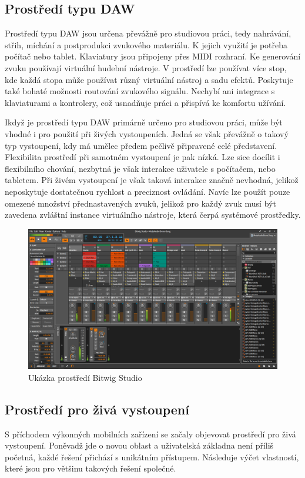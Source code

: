 \documentclass[thesis=M,czech]{FITthesis}[2019/03/06]
\begin{document}
		\subsection{Prostředí typu DAW}
			Prostředí typu DAW jsou určena převážně pro studiovou práci, tedy nahrávání, střih, míchání a postprodukci zvukového materiálu.
			K jejich využití je potřeba počítač nebo tablet. Klaviatury jsou připojeny přes MIDI rozhraní. Ke generování zvuku používají virtuální hudební nástroje.
			V prostředí lze používat více stop, kde každá stopa může používat různý virtuální nástroj a sadu efektů.
			Poskytuje také bohaté možnosti routování zvukového signálu.
			Nechybí ani integrace s klaviaturami a kontrolery, což usnadňuje práci a přispívá ke komfortu užívání.
			
			Ikdyž je prostředí typu DAW primárně určeno pro studiovou práci, může být vhodné i pro použití při živých vystoupeních.
			Jedná se však převážně o takový typ vystoupení, kdy má umělec předem pečlivě připravené celé představení.
			Flexibilita prostředí při samotném vystoupení je pak nízká.
			Lze sice docílit i flexibilního chování, nezbytná je však interakce uživatele s počítačem, nebo tabletem. Při živém vystoupení
			je však taková interakce značně nevhodná, jelikož neposkytuje dostatečnou rychlost a preciznost ovládání.
			Navíc lze použít pouze omezené množství přednastavených zvuků, jelikož pro každý zvuk musí být zavedena zvláštní instance
			virtuálního nástroje, která čerpá systémové prostředky.
			
			\begin{figure}[H]
				\centering
				\includegraphics[width=1\textwidth]{DAW}
				\caption[Bitwig Studio]{Ukázka prostředí Bitwig Studio}\label{fig:DAW}
			\end{figure}
			
\clearpage
		\subsection{Prostředí pro živá vystoupení}
			S příchodem výkonných mobilních zařízení se začaly objevovat prostředí pro živá vystoupení.
			Poněvadž jde o novou oblast a uživatelská základna není příliš početná, každé řešení přichází
			s unikátním přístupem. Následuje výčet vlastností, které jsou pro většinu takových řešení společné.
			
\end{document}
